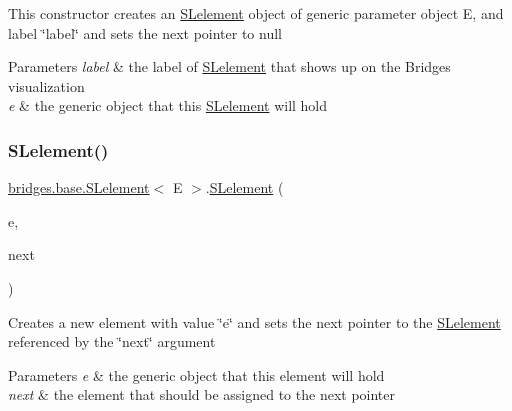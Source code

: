 This constructor creates an \mbox{\hyperlink{classbridges_1_1base_1_1_s_lelement}{S\+Lelement}} object of generic parameter object E, and label \char`\"{}label\char`\"{} and sets the next pointer to null


\begin{DoxyParams}{Parameters}
{\em label} & the label of \mbox{\hyperlink{classbridges_1_1base_1_1_s_lelement}{S\+Lelement}} that shows up on the Bridges visualization \\
\hline
{\em e} & the generic object that this \mbox{\hyperlink{classbridges_1_1base_1_1_s_lelement}{S\+Lelement}} will hold \\
\hline
\end{DoxyParams}
\mbox{\label{classbridges_1_1base_1_1_s_lelement_abc5e333fd2f3289eede108175908f97d}} 
\subsubsection{\texorpdfstring{S\+Lelement()}{SLelement()}\hspace{0.1cm}{\footnotesize\ttfamily [3/5]}}
{\footnotesize\ttfamily \mbox{\hyperlink{classbridges_1_1base_1_1_s_lelement}{bridges.\+base.\+S\+Lelement}}$<$ E $>$.\mbox{\hyperlink{classbridges_1_1base_1_1_s_lelement}{S\+Lelement}} (\begin{DoxyParamCaption}\item[{E}]{e,  }\item[{\mbox{\hyperlink{classbridges_1_1base_1_1_s_lelement}{S\+Lelement}}$<$ E $>$}]{next }\end{DoxyParamCaption})}

Creates a new element with value \char`\"{}e\char`\"{} and sets the next pointer to the \mbox{\hyperlink{classbridges_1_1base_1_1_s_lelement}{S\+Lelement}} referenced by the \char`\"{}next\char`\"{} argument


\begin{DoxyParams}{Parameters}
{\em e} & the generic object that this element will hold \\
\hline
{\em next} & the element that should be assigned to the next pointer \\
\hline
\end{DoxyParams}
\mbox{\label{classbridges_1_1base_1_1_s_lelement_aa40c4c7bda4d7a852edb21a8ed537cae}} 
